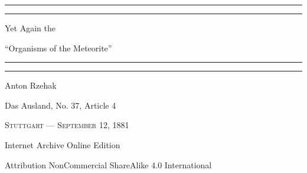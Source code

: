 \documentclass[a4paper, 12pt, oneside]{article}
\begin{document}
\begin{titlepage} %
	\centering %
	\scshape %

	
	\rule{\textwidth}{1.6pt}\vspace*{-\baselineskip}\vspace*{2pt} %
	\rule{\textwidth}{0.4pt} %
	
	\vspace{1\baselineskip} %
	
	{\LARGE Yet Again the} %
	
    {\LARGE ``Organisms of the Meteorite''} %
	
	\vspace{0.5\baselineskip} %
	
	\rule{\textwidth}{0.4pt}\vspace*{-\baselineskip}\vspace{3.2pt} %
	\rule{\textwidth}{1.6pt} %
	
	\vspace{1\baselineskip} %
	
	
	{Anton Rzehak} %
	
	\vspace*{1\baselineskip} %
	
    {\small Das Ausland, No. 37, Article 4} %
    
	
	\vspace{1\baselineskip}

	{\small\scshape Stuttgart --- September 12, 1881 \\ }
			
    \vspace*{\fill}

    Internet Archive Online Edition  %
	
	{\small Attribution NonCommercial ShareAlike 4.0 International } %
\end{titlepage}
\setlength{\parskip}{1mm plus1mm minus1mm}
\clearpage
\end{document}
